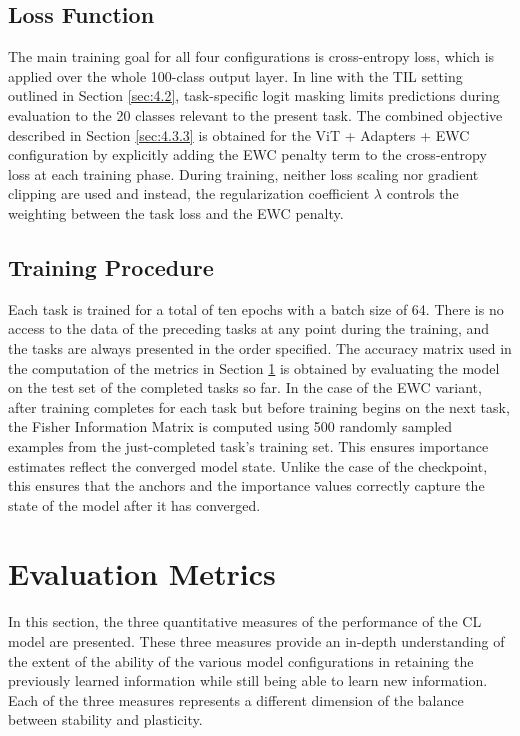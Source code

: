 \documentclass[english, LaM, oneside]{sapthesis}%
\numberwithin{equation}{chapter}
\begin{document}
\subsection{Loss Function}
The main training goal for all four configurations is cross-entropy loss, which is applied over the whole 100-class output layer. In line with the TIL setting outlined in Section \ref{sec:4.2}, task-specific logit masking limits predictions during evaluation to the 20 classes relevant to the present task. The combined objective described in Section \ref{sec:4.3.3} is obtained for the ViT + Adapters + EWC configuration by explicitly adding the EWC penalty term to the cross-entropy loss at each training phase. During training, neither loss scaling nor gradient clipping are used and instead, the regularization coefficient $\lambda$ controls the weighting between the task loss and the EWC penalty.

\subsection{Training Procedure}
Each task is trained for a total of ten epochs with a batch size of 64. There is no access to the data of the preceding tasks at any point during the training, and the tasks are always presented in the order specified. The accuracy matrix used in the computation of the metrics in Section \ref{sec:4.5} is obtained by evaluating the model on the test set of the completed tasks so far. In the case of the EWC variant, after training completes for each task but before training begins on the next task, the Fisher Information Matrix is computed using 500 randomly sampled examples from the just-completed task's training set. This ensures importance estimates reflect the converged model state. Unlike the case of the checkpoint, this ensures that the anchors and the importance values correctly capture the state of the model after it has converged.

\section{Evaluation Metrics}
\label{sec:4.5}
In this section, the three quantitative measures of the performance of the CL model are presented. These three measures provide an in-depth understanding of the extent of the ability of the various model configurations in retaining the previously learned information while still being able to learn new information. Each of the three measures represents a different dimension of the balance between stability and plasticity. 
\end{document}
